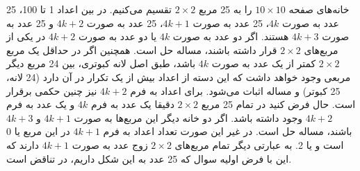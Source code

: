 \p
خانه‌های صفحه 
$10\times10$
را به 25 مربع
$2\times2$
تقسیم می‌کنیم. در بین اعداد 1 تا 100، 25 عدد به صورت
$4k$،
25 عدد به صورت
$4k + 1$،
25 عدد به صورت
$4k + 2$
و 25 عدد به صورت 
$4k + 3$
هستند. اگر دو عدد به صورت
$4k$
یا دو عدد به صورت
$4k + 2$
در یکی از مربع‌های
$2\times2$
قرار داشته باشند، مساله حل است.
همچنین اگر در حداقل یک مربع 
$2\times2$
کمتر از یک عدد به صورت
$4k$
باشد، طبق اصل لانه کبوتری، بین 24 مربع دیگر مربعی وجود خواهد داشت که این دسته از اعداد بیش از یک تکرار در آن دارد (24 لانه، 25 کبوتر) و مساله اثبات می‌شود.
برای اعداد به فرم
$4k + 2$
نیز چنین حکمی برقرار است.
حال فرض کنید در تمام 25 مربع 
$2\times2$
دقیقا یک عدد به فرم
$4k$
و یک عدد به فرم
$4k + 2$
وجود داشته باشد.
اگر دو خانه دیگر این مربع‌ها به صورت 
$4k + 1$
و 
$4k + 3$
باشند، مساله حل است.
در غیر این صورت تعداد اعداد به فرم
$4k + 1$
در این مربع یا 0 است و یا 2. به عبارتی دیگر تمام مربع‌های 
$2\times2$
زوج عدد به صورت
$4k + 1$
دارند که این با فرض اولیه سوال که 25 عدد به این شکل داریم، در تناقض است.
